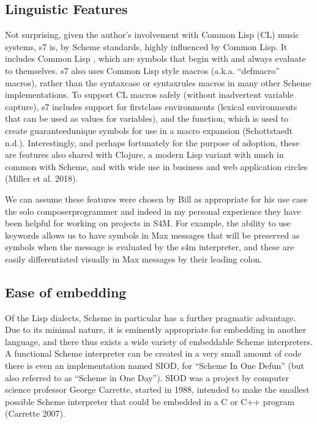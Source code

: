 \documentclass[letterpaper,10pt,english]{sphinxmanual}
\begin{document}
\subsection{Linguistic Features}
\label{\detokenize{design:linguistic-features}}
\sphinxAtStartPar
Not surprising, given the author’s involvement with Common Lisp (CL) music systems, s7 is, by Scheme standards,
highly influenced by Common Lisp.
It includes Common Lisp , which are symbols that begin with and always evaluate to themselves.
s7 also uses Common Lisp style macros (a.k.a. “defmacro” macros), rather than the syntax\sphinxhyphen{}case or syntax\sphinxhyphen{}rules macros
in many other Scheme implementations.
To support CL macros safely (without inadvertent variable capture), s7 includes support for first\sphinxhyphen{}class environments
(lexical environments that can be used as values for variables), and the  function, which is used to create
guaranteed\sphinxhyphen{}unique symbols for use in a macro expansion (Schottstaedt n.d.).
Interestingly, and perhaps fortunately for the purpose of adoption, these are features also shared with Clojure,
a modern Lisp variant with much in common with Scheme, and with wide use in business and web application circles
(Miller et al. 2018).

\sphinxAtStartPar
We can assume these features were chosen by Bill as appropriate for his use case \sphinxhyphen{} the solo composer\sphinxhyphen{}programmer \sphinxhyphen{}
and indeed in my personal experience they have been helpful for working on projects in S4M.
For example, the ability to use keywords allows us to have symbols in Max messages that will be preserved
as symbols when the message is evaluated by the s4m interpreter, and these are easily differentiated visually in Max
messages by their leading colon.


\subsection{Ease of embedding}
\label{\detokenize{design:ease-of-embedding}}
\sphinxAtStartPar
Of the Lisp dialects, Scheme in particular has a further pragmatic advantage.
Due to its minimal nature, it is eminently appropriate for embedding in another language,
and there thus exists a wide variety of embeddable Scheme interpreters.
A functional Scheme interpreter can be created in a very small amount of code \sphinxhyphen{}
there is even an implementation named SIOD, for “Scheme In One Defun” (but also referred to as “Scheme in One Day”).
SIOD was a project by computer science professor George Carrette, started in 1988, intended to make
the smallest possible Scheme interpreter that could be embedded in a C or C++ program (Carrette 2007).
\end{document}
